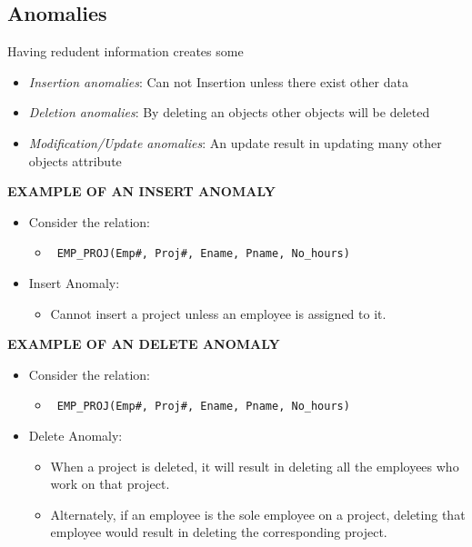\documentclass{article}
\begin{document}
\subsection{Anomalies}
Having redudent information creates some 
\begin{itemize}
    \item \textit{Insertion anomalies}: Can not Insertion unless there exist other data
    \item \textit{Deletion anomalies}: By deleting an objects other objects will be deleted 
    \item \textit{Modification/Update anomalies}: An update result in updating many other objects attribute
\end{itemize}

\textbf{EXAMPLE OF AN INSERT ANOMALY}
\begin{itemize}
    \item Consider the relation:
    \begin{itemize}
        \item  \begin{verbatim} EMP_PROJ(Emp#, Proj#, Ename, Pname, No_hours) \end{verbatim}
    \end{itemize}
    \item Insert Anomaly:
    \begin{itemize}
        \item Cannot insert a project unless an employee is
            assigned to it.
    \end{itemize}
\end{itemize}


\textbf{EXAMPLE OF AN DELETE ANOMALY}
\begin{itemize}
    \item Consider the relation:
    \begin{itemize}
        \item  \begin{verbatim} EMP_PROJ(Emp#, Proj#, Ename, Pname, No_hours) \end{verbatim}
    \end{itemize}
    \item Delete Anomaly:
    \begin{itemize}
        \item When a project is deleted, it will result in deleting
            all the employees who work on that project.
        \item Alternately, if an employee is the sole employee
            on a project, deleting that employee would result in
            deleting the corresponding project.
    \end{itemize}
\end{itemize}
\end{document}
